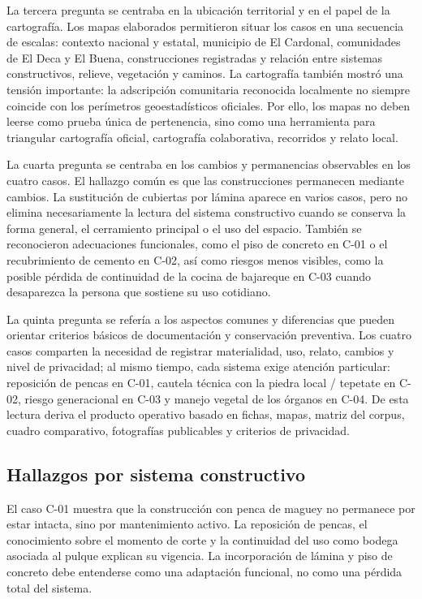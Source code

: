 La tercera pregunta se centraba en la ubicación territorial y en el papel de la cartografía. Los mapas elaborados permitieron situar los casos en una secuencia de escalas: contexto nacional y estatal, municipio de El Cardonal, comunidades de El Deca y El Buena, construcciones registradas y relación entre sistemas constructivos, relieve, vegetación y caminos. La cartografía también mostró una tensión importante: la adscripción comunitaria reconocida localmente no siempre coincide con los perímetros geoestadísticos oficiales. Por ello, los mapas no deben leerse como prueba única de pertenencia, sino como una herramienta para triangular cartografía oficial, cartografía colaborativa, recorridos y relato local.

La cuarta pregunta se centraba en los cambios y permanencias observables en los cuatro casos. El hallazgo común es que las construcciones permanecen mediante cambios. La sustitución de cubiertas por lámina aparece en varios casos, pero no elimina necesariamente la lectura del sistema constructivo cuando se conserva la forma general, el cerramiento principal o el uso del espacio. También se reconocieron adecuaciones funcionales, como el piso de concreto en C-01 o el recubrimiento de cemento en C-02, así como riesgos menos visibles, como la posible pérdida de continuidad de la cocina de bajareque en C-03 cuando desaparezca la persona que sostiene su uso cotidiano.

La quinta pregunta se refería a los aspectos comunes y diferencias que pueden orientar criterios básicos de documentación y conservación preventiva. Los cuatro casos comparten la necesidad de registrar materialidad, uso, relato, cambios y nivel de privacidad; al mismo tiempo, cada sistema exige atención particular: reposición de pencas en C-01, cautela técnica con la piedra local / tepetate en C-02, riesgo generacional en C-03 y manejo vegetal de los órganos en C-04. De esta lectura deriva el producto operativo basado en fichas, mapas, matriz del corpus, cuadro comparativo, fotografías publicables y criterios de privacidad.

\subsection{Hallazgos por sistema constructivo}

El caso C-01 muestra que la construcción con penca de maguey no permanece por estar intacta, sino por mantenimiento activo. La reposición de pencas, el conocimiento sobre el momento de corte y la continuidad del uso como bodega asociada al pulque explican su vigencia. La incorporación de lámina y piso de concreto debe entenderse como una adaptación funcional, no como una pérdida total del sistema.

